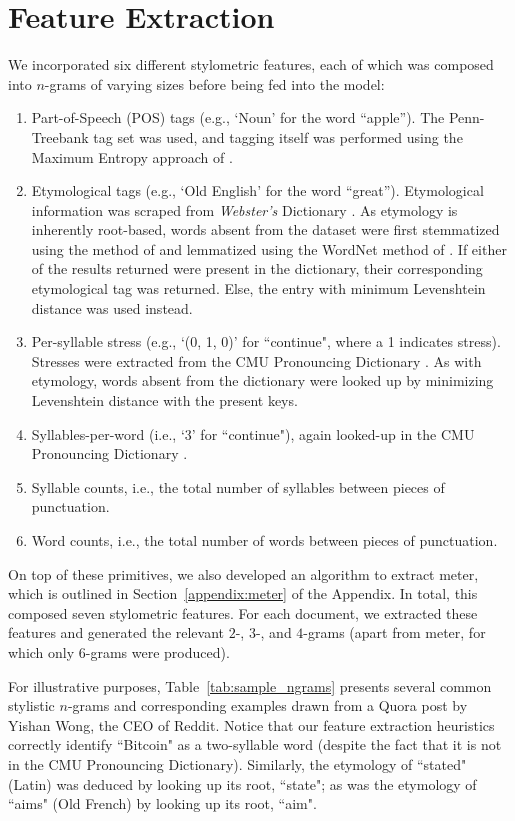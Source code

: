 \documentclass[14pt]{article} %
\theoremstyle{plain}
\theoremstyle{definition}
\theoremstyle{remark}
\begin{document}
\section{Feature Extraction}

We incorporated six different stylometric features, each of which was composed into $n$-grams of varying sizes before being fed into the model:
\begin{enumerate}
\item Part-of-Speech (POS) tags (e.g., `Noun' for the word ``apple''). The Penn-Treebank tag set was used, and tagging itself was performed using the Maximum Entropy approach of \citet{Ratnaparkhi}.
\item Etymological tags (e.g., `Old English' for the word ``great''). Etymological information was scraped from \textit{Webster's} Dictionary \citep{Dictionary}. As etymology is inherently root-based, words absent from the dataset were first stemmatized using the method of \citet{Porter} and lemmatized using the WordNet method of \citet{Fellbaum}. If either of the results returned were present in the dictionary, their corresponding etymological tag was returned. Else, the entry with minimum Levenshtein distance \citep{Levenshtein} was used instead.
\item Per-syllable stress (e.g., `(0, 1, 0)' for ``continue", where a 1 indicates stress). Stresses were extracted from the CMU Pronouncing Dictionary \citep{Lenzo}. As with etymology, words absent from the dictionary were looked up by minimizing Levenshtein distance with the present keys.
\item Syllables-per-word (i.e., `3' for ``continue"), again looked-up in the CMU Pronouncing Dictionary \citep{Lenzo}.
\item Syllable counts, i.e., the total number of syllables between pieces of punctuation.
\item Word counts, i.e., the total number of words between pieces of punctuation.
\end{enumerate}On top of these primitives, we also developed an algorithm to extract meter, which is outlined in Section~\ref{appendix:meter} of the Appendix. In total, this composed seven stylometric features. For each document, we extracted these features and generated the relevant $2$-, $3$-, and $4$-grams (apart from meter, for which only $6$-grams were produced).

For illustrative purposes, Table~\ref{tab:sample_ngrams} presents several common stylistic $n$-grams and corresponding examples drawn from a Quora post by Yishan Wong, the CEO of Reddit. Notice that our feature extraction heuristics correctly identify ``Bitcoin" as a two-syllable word (despite the fact that it is not in the CMU Pronouncing Dictionary). Similarly, the etymology of ``stated" (Latin) was deduced by looking up its root, ``state"; as was the etymology of ``aims" (Old French) by looking up its root, ``aim".
\end{document}
